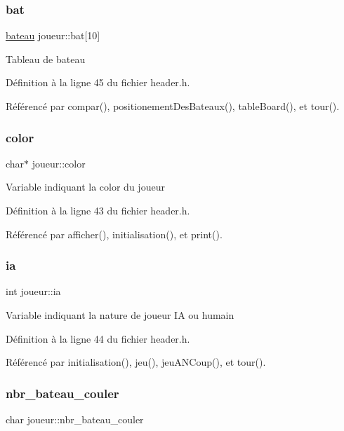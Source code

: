 \subsubsection{\texorpdfstring{bat}{bat}}
{\footnotesize\ttfamily \mbox{\hyperlink{structbateau}{bateau}} joueur\+::bat\mbox{[}10\mbox{]}}

Tableau de bateau 

Définition à la ligne 45 du fichier header.\+h.



Référencé par compar(), positionement\+Des\+Bateaux(), table\+Board(), et tour().

\mbox{\label{structjoueur_a1064ba94d4d2719446f3c609135ba362}} 
\subsubsection{\texorpdfstring{color}{color}}
{\footnotesize\ttfamily char$\ast$ joueur\+::color}

Variable indiquant la color du joueur 

Définition à la ligne 43 du fichier header.\+h.



Référencé par afficher(), initialisation(), et print().

\mbox{\label{structjoueur_a307e3b4b4c1b78e753c599bc1f6a47c3}} 
\subsubsection{\texorpdfstring{ia}{ia}}
{\footnotesize\ttfamily int joueur\+::ia}

Variable indiquant la nature de joueur IA ou humain 

Définition à la ligne 44 du fichier header.\+h.



Référencé par initialisation(), jeu(), jeu\+A\+N\+Coup(), et tour().

\mbox{\label{structjoueur_ab0c0fa544d83148d4daed41c84954e55}} 
\subsubsection{\texorpdfstring{nbr\+\_\+bateau\+\_\+couler}{nbr\_bateau\_couler}}
{\footnotesize\ttfamily char joueur\+::nbr\+\_\+bateau\+\_\+couler}


